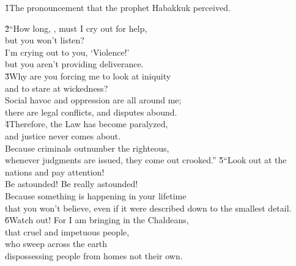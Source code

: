 


\v{1}The pronouncement that the prophet Habakkuk perceived.

\begin{poetry}
\poeml \v{2}``How long, , must I cry out for help, \\
\poeml but you won't listen? \\
\poeml I'm crying out to you, `Violence!' \\
\poemll    but you aren't providing deliverance. \\
\poeml \v{3}Why are you forcing me to look at iniquity \\
\poemll    and to stare at wickedness? \\
\poeml Social havoc and oppression are all around me; \\
\poemll    there are legal conflicts, and disputes abound. \\
\poeml \v{4}Therefore, the Law has become paralyzed, \\
\poemll    and justice never comes about. \\
\poeml Because criminals outnumber the righteous, \\
\poemll    whenever judgments are issued, they come out crooked.''
\poeml \v{5}``Look out at the nations and pay attention! \\
\poemll    Be astounded! Be really astounded! \\
\poeml Because something is happening in your lifetime \\
\poemll    that you won't believe, even if it were described down to the smallest detail. \\
\poeml \v{6}Watch out! For I am bringing in the Chaldeans, \\
\poemll    that cruel and impetuous people, \\
\poeml who sweep across the earth \\
\poemll    dispossessing people from homes not their own. \\

\end{poetry}
